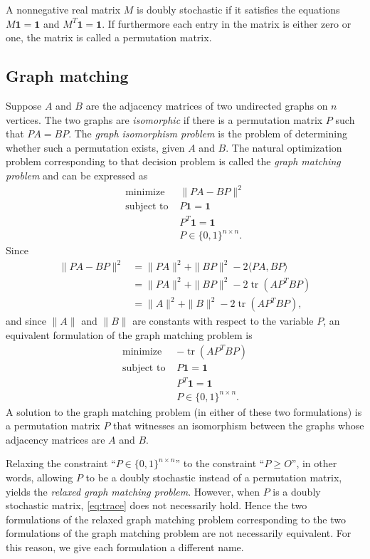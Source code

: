 \documentclass{article}
\newcommand{\1}{\mathbf{1}}
\DeclareMathOperator{\tr}{tr}
\begin{document}
A nonnegative real matrix $M$ is doubly stochastic if it satisfies the equations $M \mathbf{1} = \mathbf{1}$ and $M^T \mathbf{1} = \mathbf{1}$.
If furthermore each entry in the matrix is either zero or one, the matrix is called a permutation matrix.

\subsection{Graph matching}

Suppose $A$ and $B$ are the adjacency matrices of two undirected graphs on $n$ vertices.
The two graphs are \emph{isomorphic} if there is a permutation matrix $P$ such that $PA = BP$.
The \emph{graph isomorphism problem} is the problem of determining whether such a permutation exists, given $A$ and $B$.
The natural optimization problem corresponding to that decision problem is called the \emph{graph matching problem} and can be expressed as
\begin{align*}
  \text{minimize } & \|PA - BP\|^2 \\
  \text{subject to } & P \1 = \1 \\
  & P^T \1 = \1 \\
  & P \in \{0, 1\}^{n \times n}.
\end{align*}
Since
\begin{align}\label{eq:trace}
  \|PA - BP\|^2 & = \|PA\|^2 + \|BP\|^2 - 2 \langle PA, BP \rangle \nonumber \\
  & = \|PA\|^2 + \|BP\|^2 - 2 \tr(AP^TBP) \nonumber \\
  & = \|A\|^2 + \|B\|^2 - 2 \tr(AP^TBP),
\end{align}
and since $\|A\|$ and $\|B\|$ are constants with respect to the variable $P$, an equivalent formulation of the graph matching problem is
\begin{align*}
  \text{minimize } & -\tr(AP^TBP) \\
  \text{subject to } & P \1 = \1 \\
  & P^T \1 = \1 \\
  & P \in \{0, 1\}^{n \times n}.
\end{align*}
A solution to the graph matching problem (in either of these two formulations) is a permutation matrix $P$ that witnesses an isomorphism between the graphs whose adjacency matrices are $A$ and $B$.

Relaxing the constraint ``$P \in \{0, 1\}^{n \times n}$'' to the constraint ``$P \geq O$'', in other words, allowing $P$ to be a doubly stochastic instead of a permutation matrix, yields the \emph{relaxed graph matching problem}.
However, when $P$ is a doubly stochastic matrix, \autoref{eq:trace} does not necessarily hold.
Hence the two formulations of the relaxed graph matching problem corresponding to the two formulations of the graph matching problem are not necessarily equivalent.
For this reason, we give each formulation a different name.
\end{document}
